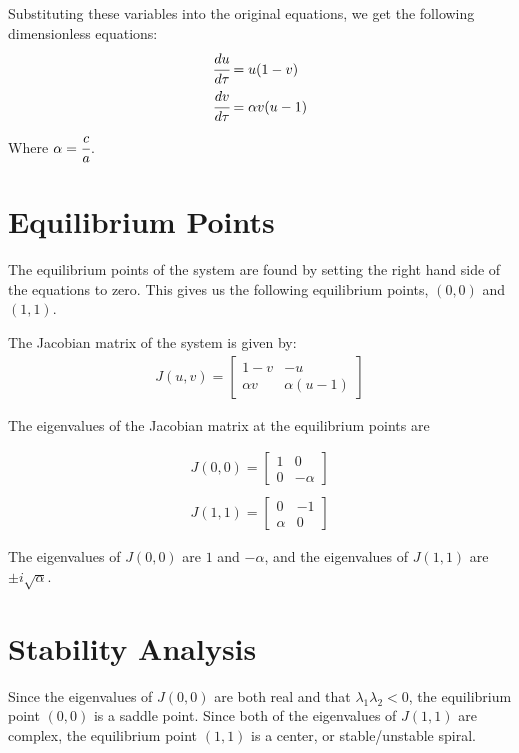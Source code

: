 \documentclass[11pt, letterpaper]{article}
\begin{document}
Substituting these variables into the original equations, we get the
following dimensionless equations:
\begin{align}
    \cfrac{du}{d\tau} & = u(1 - v)      \\
    \cfrac{dv}{d\tau} & = \alpha v(u-1)
\end{align}
Where $\alpha = \cfrac[diagonal]{c}{a}$.

\section{Equilibrium Points}
The equilibrium points of the system are found by setting the right hand
side of the equations to zero. This gives us the following equilibrium
points, $(0, 0)$ and $(1, 1)$.

\noindent The Jacobian matrix of the system is given by:
\begin{align*}
    J(u, v) = \begin{bmatrix}
                  1-v      & -u          \\
                  \alpha v & \alpha(u-1)
              \end{bmatrix}
\end{align*}

The eigenvalues of the Jacobian matrix at the equilibrium points are

\begin{align*}
    J(0, 0) = \begin{bmatrix}
                  1 & 0       \\
                  0 & -\alpha
              \end{bmatrix} \\
\end{align*}
\begin{align*}
    J(1, 1) = \begin{bmatrix}
                  0      & -1 \\
                  \alpha & 0
              \end{bmatrix}
\end{align*}

The eigenvalues of $J(0, 0)$ are $1$ and $-\alpha$, and the eigenvalues of
$J(1, 1)$ are $\pm i\sqrt{\alpha}$.

\section{Stability Analysis}

Since the eigenvalues of $J(0, 0)$ are both real and that $\lambda_1
    \lambda_2 < 0$, the equilibrium point $(0, 0)$ is a saddle point.
Since both of the eigenvalues of $J(1, 1)$ are complex, the equilibrium
point $(1, 1)$ is a center, or stable/unstable spiral.
\end{document}
